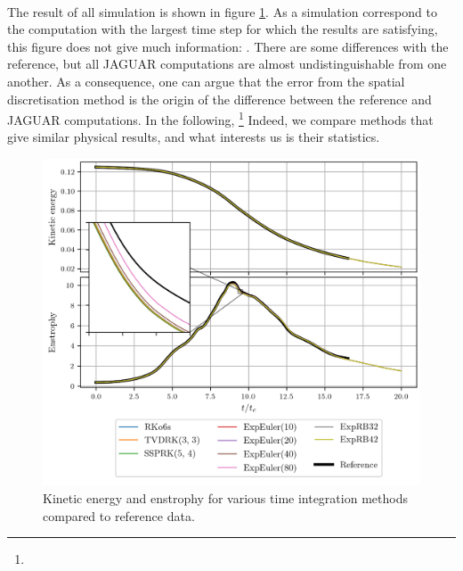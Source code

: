       \paragraph{}
      The result of all simulation is shown in figure \ref{fig:tgv_curves}.
      As a simulation correspond to the computation with the largest time step for which the results are satisfying, this figure does not give much information: .
      There are some differences with the reference, but all JAGUAR computations are almost undistinguishable from one another.
      As a consequence, one can argue that the error from the spatial discretisation method is the origin of the difference between
      the reference and JAGUAR computations.
      In the following, \footnote{}
      Indeed, we compare methods that give similar physical results, and what interests us is their statistics.

      \begin{figure}
        \centering
        \includegraphics{figures/tgv_curves.png}
        \caption{Kinetic energy and enstrophy for various time integration methods compared to reference data.}
        \label{fig:tgv_curves}
      \end{figure}


